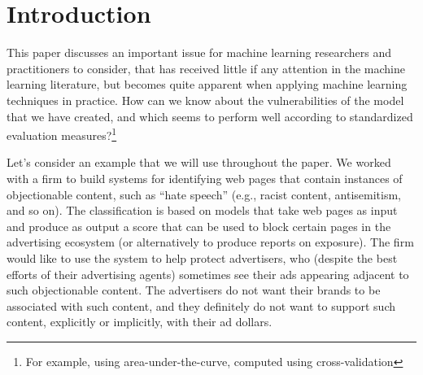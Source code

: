 \section{Introduction}
\label{sec:intro}

This paper discusses an important issue for machine learning researchers and practitioners to consider, that has received little if any attention in the machine learning literature, but becomes quite apparent when applying machine learning techniques in practice. How can we know about the vulnerabilities of the model that we have created, and which seems to perform well according to standardized evaluation measures?\footnote{For example, using area-under-the-curve, computed using cross-validation}

Let's consider an example that we will use throughout the paper.  We worked with a firm to build systems for identifying web pages that contain instances of objectionable content, such as ``hate speech'' (e.g., racist content, antisemitism, and so on). The classification is based on models that take web pages as input and produce as output a score that can be used to block certain pages in the advertising ecosystem (or alternatively to produce reports on exposure).  The firm would like to use the system to help protect advertisers, who (despite the best efforts of their advertising agents) sometimes see their ads appearing adjacent to such objectionable content.  The advertisers do not want their brands to be associated with such content, and they definitely do not want to support such content, explicitly or implicitly, with their ad dollars. 



